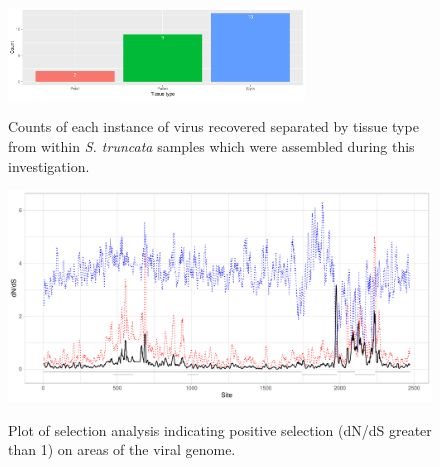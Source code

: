 \documentclass[fleqn,10pt,lineno]{wlpeerj}
\begin{document}
\begin{figure}[ht]
\centering
\caption{
Counts of each instance of virus recovered separated by tissue type from within \textit{S. truncata} samples which were assembled during this investigation.
}
\includegraphics[width=0.7\textwidth]{figures/tistype}
\label{fig:tissuetype}
\end{figure}

\begin{figure}[ht]
\centering
\caption{
Plot of selection analysis indicating positive selection (dN/dS greater than 1) on areas of the viral genome.
}
\includegraphics[width=1.0\textwidth]{figures/selectionplot.pdf}
\label{fig:tissuetype}
\end{figure}
\clearpage
\end{document}
